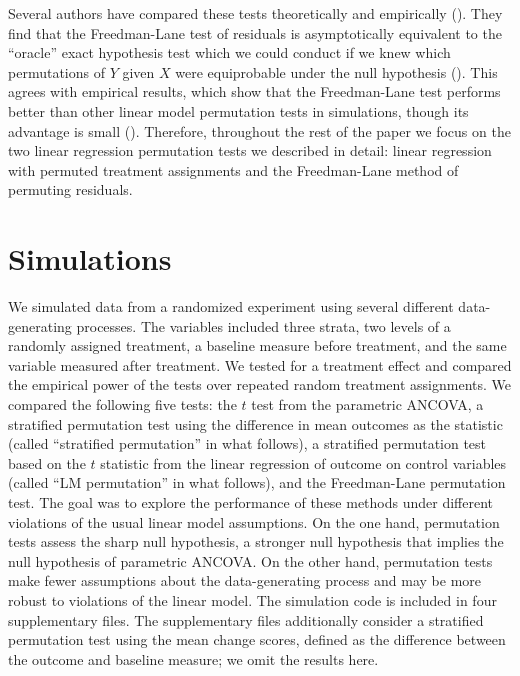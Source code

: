 \documentclass[12pt]{article}
\begin{document}
Several authors have compared these tests theoretically and empirically (\cite{anderson_empirical_1999, anderson_permutation_2001, kennedy_randomization_1996}).
They find that the Freedman-Lane test of residuals is asymptotically equivalent to the ``oracle'' exact hypothesis test which we could conduct if we knew which permutations of $Y$ given $X$ were equiprobable under the null hypothesis (\cite{anderson_permutation_2001}).
This agrees with empirical results, which show that the Freedman-Lane test performs better than other linear model permutation tests in simulations, though its advantage is small (\cite{anderson_empirical_1999}). 
Therefore, throughout the rest of the paper we focus on the two linear regression permutation tests we described in detail: linear regression with permuted treatment assignments and the Freedman-Lane method of permuting residuals.


\section{Simulations}\label{sec:simulations}

We simulated data from a randomized experiment using several different data-generating processes.
The variables included three strata, two levels of a randomly assigned treatment, a baseline measure before treatment, and the same variable measured after treatment.
We tested for a treatment effect and compared the empirical power of the tests over repeated random treatment assignments.
We compared the following five tests:
the $t$ test from the parametric ANCOVA,
a stratified permutation test using the difference in mean outcomes as the statistic
 (called ``stratified permutation'' in what follows),
a stratified permutation test based on the $t$ statistic from the linear regression of outcome on control variables (called ``LM permutation'' in what follows),
and the Freedman-Lane permutation test.
The goal was to explore the performance of these methods under different violations of the usual linear model assumptions.
On the one hand, permutation tests assess the sharp null hypothesis, a stronger null hypothesis that implies the null hypothesis of parametric ANCOVA.
On the other hand, permutation tests make fewer assumptions about the data-generating process and may be more robust to violations of the linear model.
The simulation code is included in four supplementary files.
The supplementary files additionally consider a stratified permutation test using the mean change scores, defined as the difference between the outcome and baseline measure;
we omit the results here.
\end{document}

